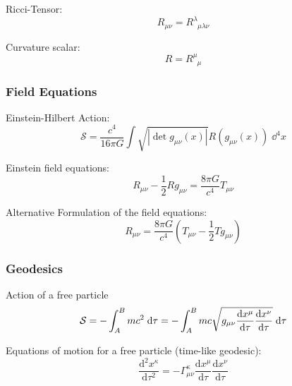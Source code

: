 			\noindent
			Ricci-Tensor:
			\begin{equation}
				R_{\mu\nu} = R^\lambda_{\phantom{\lambda}\mu\lambda\nu}
			\end{equation}

			\noindent
			Curvature scalar:
			\begin{equation}
				R = R^\mu_{\phantom{\mu}\mu}
			\end{equation}

		\subsubsection{Field Equations}
			\noindent
			Einstein-Hilbert Action:
			\begin{equation}
				\mathcal{S} = \frac{c^4}{16\pi G} \int \sqrt{\left|\det{g_{\mu\nu}(x)}\right|} R(g_{\mu\nu}(x))\;\dd^4 x
			\end{equation}

			\noindent
			Einstein field equations:
			\begin{equation}
				R_{\mu\nu} - \frac{1}{2} R g_{\mu\nu} = \frac{8\pi G}{c^4} T_{\mu\nu}
			\end{equation}

			\noindent
			Alternative Formulation of the field equations:
			\begin{equation}
				R_{\mu\nu} = \frac{8\pi G}{c^4} \left( T_{\mu\nu} - \frac{1}{2} T g_{\mu\nu} \right)
			\end{equation}


		\subsubsection{Geodesics}
			\noindent
			Action of a free particle%
			\begin{equation}
				\mathcal{S} = -\int_A^B mc^2\;\dd \tau = -\int_A^B mc\sqrt{g_{\mu\nu} \frac{\dd x^\mu}{\dd \tau} \frac{\dd x^\nu}{\dd \tau}} \;\dd \tau
			\end{equation}

			\noindent
			Equations of motion for a free particle (time-like geodesic):%
			\begin{equation}
				\frac{\mathrm{d}^2 x^\kappa}{\mathrm{d}\tau^2}=-\Gamma_{\mu\nu}^{\kappa}\frac{\mathrm{d}x^\mu}{\mathrm{d}\tau}\frac{\mathrm{d}x^\nu}{\mathrm{d}\tau}
			\end{equation}

